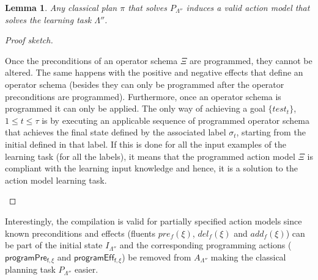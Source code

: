 \documentclass[letterpaper]{article} %
\newtheorem{lemma}[theorem]{Lemma}
\begin{document}
\begin{lemma}
Any classical plan $\pi$ that solves $P_{\Lambda''}$ induces a valid action model that solves the learning task $\Lambda''$.
\end{lemma}

\begin{proof}[Proof sketch]
\begin{small}
Once the preconditions of an operator schema $\Xi$ are programmed, they cannot be altered. The same happens with the positive and negative effects that define an operator schema (besides they can only be programmed after the operator preconditions are programmed). Furthermore, once an operator schema is programmed it can only be applied. The only way of achieving a goal $\{test_t\}$,{\small $1\leq t\leq \tau$} is by executing an applicable sequence of programmed operator schema that achieves the final state defined by the associated label $\sigma_t$, starting from the initial defined in that label. If this is done for all the input examples of the learning task (for all the labels), it means that the programmed action model $\Xi$ is compliant with the learning input knowledge and hence, it is a solution to the action model learning task.
\end{small}
\end{proof}

Interestingly, the compilation is valid for partially specified action models since known preconditions and effects (fluents $pre_f(\xi)$, $del_f(\xi)$ and $add_f(\xi)$) can be part of the initial state $I_{\Lambda''}$ and the corresponding programming actions ($\mathsf{programPre_{f,\xi}}$ and $\mathsf{programEff_{f,\xi}}$) be removed from $A_{\Lambda''}$ making the classical planning task $P_{\Lambda''}$ easier. 
\end{document}
